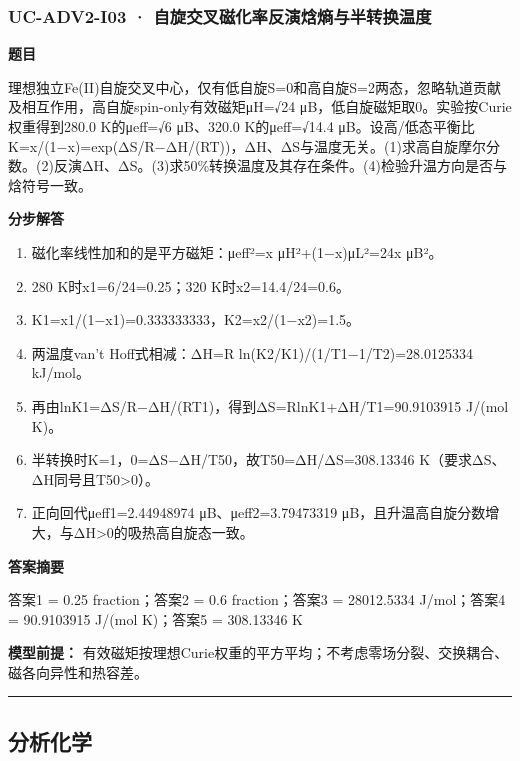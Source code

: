 \documentclass[UTF8,11pt,a4paper]{ctexart}
\begin{document}
\subsubsection*{UC-ADV2-I03 · 自旋交叉磁化率反演焓熵与半转换温度}
\noindent\textbf{题目}\par
理想独立Fe(II)自旋交叉中心，仅有低自旋S=0和高自旋S=2两态，忽略轨道贡献及相互作用，高自旋spin-only有效磁矩μH=√24 μB，低自旋磁矩取0。实验按Curie权重得到280.0 K的μeff=√6 μB、320.0 K的μeff=√14.4 μB。设高/低态平衡比K=x/(1−x)=exp(ΔS/R−ΔH/(RT))，ΔH、ΔS与温度无关。(1)求高自旋摩尔分数。(2)反演ΔH、ΔS。(3)求50\%转换温度及其存在条件。(4)检验升温方向是否与焓符号一致。\par
\medskip\noindent\textbf{分步解答}
\begin{enumerate}
\item 磁化率线性加和的是平方磁矩：μeff²=x μH²+(1−x)μL²=24x μB²。
\item 280 K时x1=6/24=0.25；320 K时x2=14.4/24=0.6。
\item K1=x1/(1−x1)=0.333333333，K2=x2/(1−x2)=1.5。
\item 两温度van't Hoff式相减：ΔH=R ln(K2/K1)/(1/T1−1/T2)=28.0125334 kJ/mol。
\item 再由lnK1=ΔS/R−ΔH/(RT1)，得到ΔS=RlnK1+ΔH/T1=90.9103915 J/(mol K)。
\item 半转换时K=1，0=ΔS−ΔH/T50，故T50=ΔH/ΔS=308.13346 K（要求ΔS、ΔH同号且T50>0）。
\item 正向回代μeff1=2.44948974 μB、μeff2=3.79473319 μB，且升温高自旋分数增大，与ΔH>0的吸热高自旋态一致。
\end{enumerate}
\noindent\textbf{答案摘要}\par
答案1 = 0.25 fraction；答案2 = 0.6 fraction；答案3 = 28012.5334 J/mol；答案4 = 90.9103915 J/(mol K)；答案5 = 308.13346 K\par
\noindent\textbf{模型前提：}
有效磁矩按理想Curie权重的平方平均；不考虑零场分裂、交换耦合、磁各向异性和热容差。\par
\medskip\hrule\medskip
\subsection*{分析化学}
\end{document}
